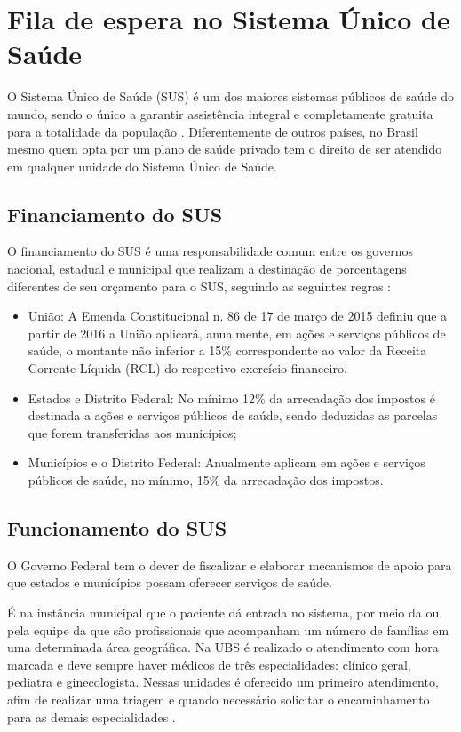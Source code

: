 \section{Fila de espera no Sistema Único de Saúde}
    O Sistema Único de Saúde (SUS) é um dos maiores sistemas públicos de saúde do mundo, sendo o único a garantir assistência integral e completamente gratuita para a totalidade da população \cite{SOUZA2002}. Diferentemente de outros países, no Brasil mesmo quem opta por um plano de saúde privado tem o direito de ser atendido em qualquer unidade do Sistema Único de Saúde.
   
   \subsection{Financiamento do SUS}
   
     O financiamento do SUS é uma responsabilidade comum entre os governos nacional, estadual e municipal que realizam a destinação de porcentagens diferentes de seu orçamento para o SUS, seguindo as seguintes regras \cite{CONASS}:
    \begin{itemize}
        \item União: A Emenda Constitucional n. 86 de 17 de março de 2015 definiu que a partir de 2016 a União aplicará, anualmente, em ações e serviços públicos de saúde, o montante não inferior a 15\% correspondente ao valor da Receita Corrente Líquida (RCL) do respectivo exercício financeiro.
        \item  Estados e Distrito Federal: No mínimo 12\% da arrecadação dos impostos é destinada a ações e serviços públicos de saúde, sendo deduzidas as parcelas que forem transferidas aos municípios;
        \item Municípios e o Distrito Federal: Anualmente aplicam em ações e serviços públicos de saúde, no mínimo, 15\% da arrecadação dos impostos.
    \end{itemize} 

   
   	\subsection{Funcionamento do SUS}
   	
    O Governo Federal tem o dever de fiscalizar e elaborar mecanismos de apoio para que estados e municípios possam oferecer serviços de saúde.

   É na instância municipal que o paciente dá entrada no sistema, por meio da  ou pela equipe da  que são profissionais que acompanham um número de famílias em uma determinada área geográfica. Na UBS é realizado o atendimento com hora marcada e deve sempre haver médicos de três especialidades: clínico geral, pediatra e ginecologista. Nessas unidades é oferecido um primeiro atendimento, afim de realizar uma triagem e quando necessário solicitar o encaminhamento para as demais especialidades \cite{CONTE2017}.
   
